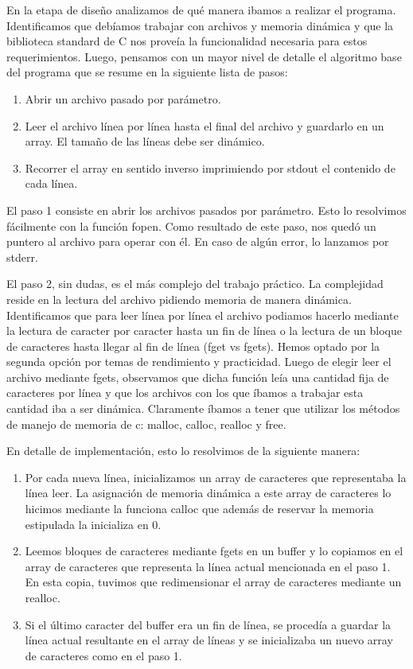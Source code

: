 \documentclass[a4paper,11pt]{article}
\begin{document}
En la etapa de dise\~no analizamos de qu\'e manera ibamos a realizar el programa. Identificamos que deb\'iamos trabajar con archivos y memoria din\'amica y que la biblioteca standard de C nos prove\'ia la funcionalidad necesaria para estos requerimientos. Luego, pensamos con un mayor nivel de detalle el algoritmo base del programa que se resume en la siguiente lista de pasos:
\begin{enumerate}
	\item Abrir un archivo pasado por par\'ametro.
	\item Leer el archivo l\'inea por l\'inea hasta el final del archivo y guardarlo en un array. El tama\~no de las l\'ineas debe ser din\'amico.
	\item Recorrer el array en sentido inverso imprimiendo por stdout el contenido de cada l\'inea.
\end{enumerate}

El paso 1 consiste en abrir los archivos pasados por par\'ametro. Esto lo resolvimos f\'acilmente con la funci\'on fopen. Como resultado de este paso, nos qued\'o un puntero al archivo para operar con \'el. En caso de alg\'un error, lo lanzamos por stderr.

El paso 2, sin dudas, es el m\'as complejo del trabajo pr\'actico. La complejidad reside en la lectura del archivo pidiendo memoria de manera din\'amica. 
Identificamos que para leer l\'inea por l\'inea el archivo podiamos hacerlo mediante la lectura de caracter por caracter hasta un fin de l\'inea o la lectura de un bloque de caracteres hasta llegar al fin de l\'inea (fget vs fgets). Hemos optado por la segunda opci\'on por temas de rendimiento y practicidad.
Luego de elegir leer el archivo mediante fgets, observamos que dicha funci\'on le\'ia una cantidad fija de caracteres por l\'inea y que los archivos con los que \'ibamos a trabajar esta cantidad iba a ser din\'amica. Claramente \'ibamos a tener que utilizar los m\'etodos de manejo de memoria de c: malloc, calloc, realloc y free.

En detalle de implementaci\'on, esto lo resolvimos de la siguiente manera:
\begin{enumerate}
	\item Por cada nueva l\'inea, inicializamos un array de caracteres que representaba la l\'inea leer. La asignaci\'on de memoria din\'amica a este array de caracteres lo hicimos mediante la funciona calloc que adem\'as de reservar la memoria estipulada la inicializa en 0.
	\item Leemos bloques de caracteres mediante fgets en un buffer y lo copiamos en el array de caracteres que representa la l\'inea actual mencionada en el paso 1. En esta copia, tuvimos que redimensionar el array de caracteres mediante un realloc.
	\item Si el \'ultimo caracter del buffer era un fin de l\'inea, se proced\'ia a guardar la l\'inea actual resultante en el array de l\'ineas y se inicializaba un nuevo array de caracteres como en el paso 1.
\end{enumerate}
\end{document}
